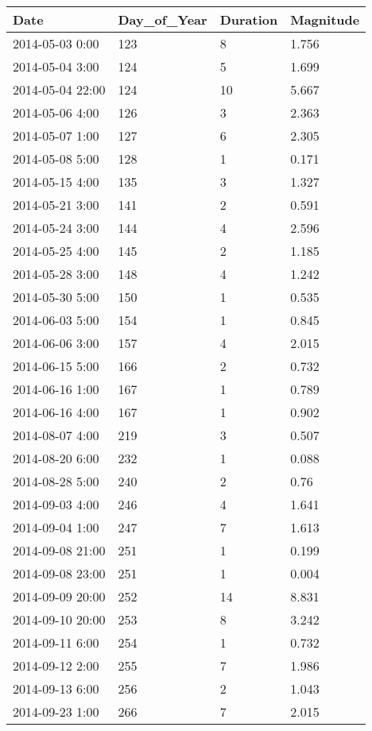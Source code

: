 \documentclass[
]{article}
\begin{document}
\begin{tabular}{l|l|l|l}
\hline
Date & Day\_of\_Year & Duration & Magnitude\\
\hline
2014-05-03 0:00 & 123 & 8 & 1.756\\
\hline
2014-05-04 3:00 & 124 & 5 & 1.699\\
\hline
2014-05-04 22:00 & 124 & 10 & 5.667\\
\hline
2014-05-06 4:00 & 126 & 3 & 2.363\\
\hline
2014-05-07 1:00 & 127 & 6 & 2.305\\
\hline
2014-05-08 5:00 & 128 & 1 & 0.171\\
\hline
2014-05-15 4:00 & 135 & 3 & 1.327\\
\hline
2014-05-21 3:00 & 141 & 2 & 0.591\\
\hline
2014-05-24 3:00 & 144 & 4 & 2.596\\
\hline
2014-05-25 4:00 & 145 & 2 & 1.185\\
\hline
2014-05-28 3:00 & 148 & 4 & 1.242\\
\hline
2014-05-30 5:00 & 150 & 1 & 0.535\\
\hline
2014-06-03 5:00 & 154 & 1 & 0.845\\
\hline
2014-06-06 3:00 & 157 & 4 & 2.015\\
\hline
2014-06-15 5:00 & 166 & 2 & 0.732\\
\hline
2014-06-16 1:00 & 167 & 1 & 0.789\\
\hline
2014-06-16 4:00 & 167 & 1 & 0.902\\
\hline
2014-08-07 4:00 & 219 & 3 & 0.507\\
\hline
2014-08-20 6:00 & 232 & 1 & 0.088\\
\hline
2014-08-28 5:00 & 240 & 2 & 0.76\\
\hline
2014-09-03 4:00 & 246 & 4 & 1.641\\
\hline
2014-09-04 1:00 & 247 & 7 & 1.613\\
\hline
2014-09-08 21:00 & 251 & 1 & 0.199\\
\hline
2014-09-08 23:00 & 251 & 1 & 0.004\\
\hline
2014-09-09 20:00 & 252 & 14 & 8.831\\
\hline
2014-09-10 20:00 & 253 & 8 & 3.242\\
\hline
2014-09-11 6:00 & 254 & 1 & 0.732\\
\hline
2014-09-12 2:00 & 255 & 7 & 1.986\\
\hline
2014-09-13 6:00 & 256 & 2 & 1.043\\
\hline
2014-09-23 1:00 & 266 & 7 & 2.015\\

\end{tabular}
\end{document}
